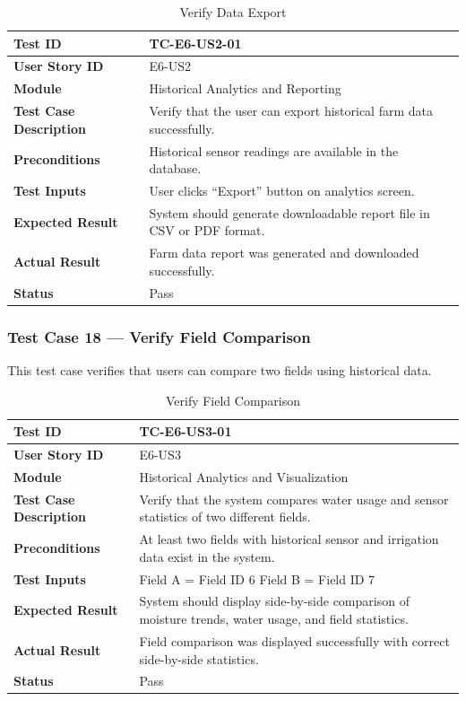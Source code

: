 \begin{longtable}{|p{4cm}|p{8cm}|}
\caption{Verify Data Export}
\label{tab:tc_export_data} \\
\hline
\textbf{Test ID} & TC-E6-US2-01 \\ \hline
\textbf{User Story ID} & E6-US2 \\ \hline
\textbf{Module} & Historical Analytics and Reporting \\ \hline
\textbf{Test Case Description} & Verify that the user can export 
historical farm data successfully. \\ \hline
\textbf{Preconditions} & Historical sensor readings are available 
in the database. \\ \hline
\textbf{Test Inputs} & User clicks ``Export'' button on analytics 
screen. \\ \hline
\textbf{Expected Result} & System should generate downloadable 
report file in CSV or PDF format. \\ \hline
\textbf{Actual Result} & Farm data report was generated and 
downloaded successfully. \\ \hline
\textbf{Status} & Pass \\ \hline
\end{longtable}

\subsubsection{Test Case 18 --- Verify Field Comparison}

This test case verifies that users can compare two fields using 
historical data.

\begin{longtable}{|p{4cm}|p{8cm}|}
\caption{Verify Field Comparison}
\label{tab:tc_compare_fields} \\
\hline
\textbf{Test ID} & TC-E6-US3-01 \\ \hline
\textbf{User Story ID} & E6-US3 \\ \hline
\textbf{Module} & Historical Analytics and Visualization \\ \hline
\textbf{Test Case Description} & Verify that the system compares 
water usage and sensor statistics of two different fields. \\ \hline
\textbf{Preconditions} & At least two fields with historical sensor 
and irrigation data exist in the system. \\ \hline
\textbf{Test Inputs} &
Field A = Field ID 6 \newline
Field B = Field ID 7 \\ \hline
\textbf{Expected Result} & System should display side-by-side 
comparison of moisture trends, water usage, and field statistics. \\ 
\hline
\textbf{Actual Result} & Field comparison was displayed 
successfully with correct side-by-side statistics. \\ \hline
\textbf{Status} & Pass \\ \hline
\end{longtable}

